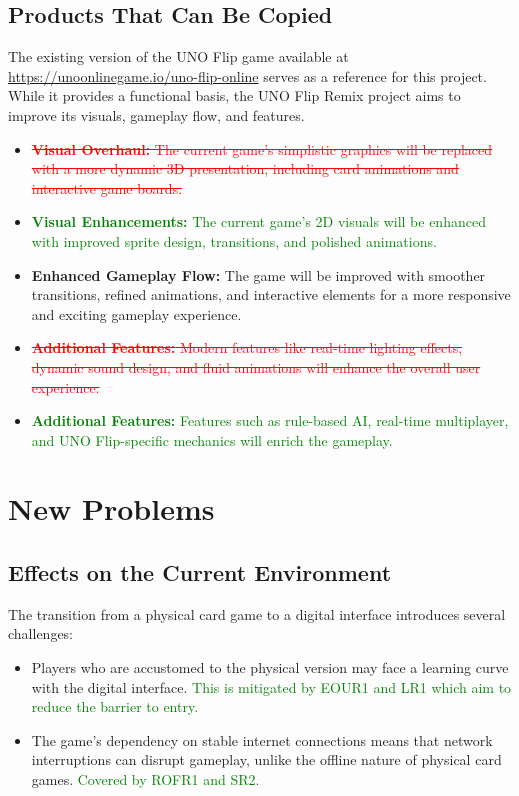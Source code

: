 \documentclass[12pt]{article}
\newcommand{\removed}[1]{\textcolor{red}{\sout{#1}}}
\newcommand{\added}[1]{\textcolor{green}{#1}}
\begin{document}
\subsection{Products That Can Be Copied}
The existing version of the UNO Flip game available at \url{https://unoonlinegame.io/uno-flip-online} serves as a reference for this project. While it provides a functional basis, the UNO Flip Remix project aims to improve its visuals, gameplay flow, and features.
\begin{itemize}
    \item \removed{\textbf{Visual Overhaul:} The current game's simplistic graphics will be replaced with a more dynamic 3D presentation, including card animations and interactive game boards.}
    \item \added{\textbf{Visual Enhancements:} The current game's 2D visuals will be enhanced with improved sprite design, transitions, and polished animations.}
    \item \textbf{Enhanced Gameplay Flow:} The game will be improved with smoother transitions, refined animations, and interactive elements for a more responsive and exciting gameplay experience.
    \item \removed{\textbf{Additional Features:} Modern features like real-time lighting effects, dynamic sound design, and fluid animations will enhance the overall user experience.}
    \item \added{\textbf{Additional Features:} Features such as rule-based AI, real-time multiplayer, and UNO Flip-specific mechanics will enrich the gameplay.}
\end{itemize}

\section{New Problems}

\subsection{Effects on the Current Environment}
The transition from a physical card game to a digital interface introduces several challenges:
\begin{itemize}
    \item Players who are accustomed to the physical version may face a learning curve with the digital interface. \added{This is mitigated by EOUR1 and LR1 which aim to reduce the barrier to entry.}
    \item The game’s dependency on stable internet connections means that network interruptions can disrupt gameplay, unlike the offline nature of physical card games. \added{Covered by ROFR1 and SR2.}
\end{itemize}
\end{document}
